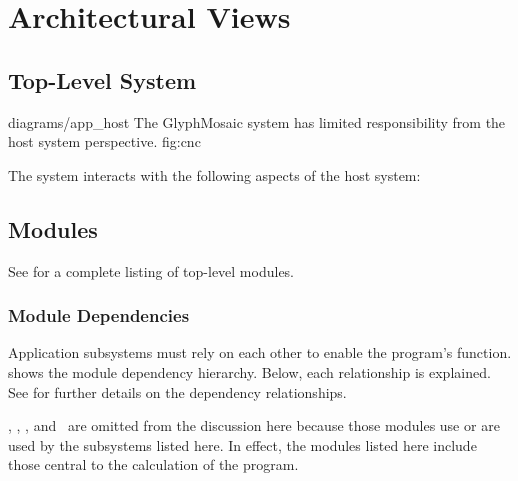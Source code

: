 \section{Architectural Views}
\label{sec:views}
\subsection{Top-Level System}
\sidiagram
{diagrams/app_host}
{The GlyphMosaic system has limited responsibility from the host system perspective.}
{fig:cnc}
{\diagsize}

The system interacts with the following aspects of the host system:
\begin{itemize}
\end{itemize}


\subsection{Modules}
\label{sec:modules}
See  for a complete listing of top-level modules.


\subsubsection{Module Dependencies}
Application subsystems must rely on each other to enable the program's function.
 shows the module dependency hierarchy.
Below, each relationship is explained.
See  for further details on the dependency relationships.

\docmod, \uimod, \permod, and \bmmod\ are omitted from the discussion here because those modules use or are used by the subsystems listed here.
In effect, the modules listed here include those central to the calculation of the program.

